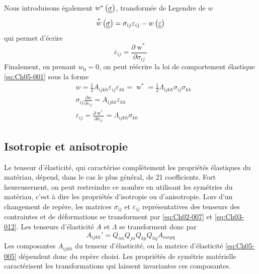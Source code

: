 Nous introduisons également $\mathop{w}^{*}\left( \underline{\underline{\sigma}} \right)$, transformée de Legendre de $w$
\begin{equation}
    \mathop{w}^{*}\left( \underline{\underline{\sigma}} \right) = \sigma_{ij} \varepsilon_{ij} - w \left( \underline{\underline{\varepsilon}} \right)
    \label{eq:Ch05-010}
\end{equation}
qui permet d'écrire
\begin{equation}
    \varepsilon_{ij} = \frac{\partial \mathop{w}^*}{\partial \sigma_{ij}}
    \label{eq:Ch05-011}
\end{equation}
Finalement, en prenant $w_0=0$, on peut réécrire la loi de comportement élastique \eqref{eq:Ch05-001} sous la forme
\begin{equation}
    \begin{aligned}
        & w = \frac{1}{2} A_{ijkh} \varepsilon_{ij} \varepsilon_{kh} = \mathop{w}^* = \frac{1}{2} \Lambda_{ijkh} \sigma_{ij} \sigma_{kh} \\
        & \sigma_{ij} \frac{\partial w}{\partial \varepsilon_{ij}} = A_{ijkh} \varepsilon_{kh} \\
        & \varepsilon_{ij} = \frac{\partial \mathop{w}^*}{\partial \sigma_{ij}} = \Lambda_{ijkh} \sigma_{kh}
    \end{aligned}
    \label{eq:Ch05-012}
\end{equation}

\subsection{Isotropie et anisotropie}
Le tenseur d'élasticité, qui caractérise complètement les propriétés élastiques du matériau, dépend, dans le cas le plus général, de 21 coefficients.
Fort heureusernent, on peut restreindre ce nombre en utilisant les symétries du matériau, c'est à dire les propriétés d'isotropie ou d'anisotropie.
Lors d'un changement de repère, les matrices $\sigma_{ij}$ et $\varepsilon_{ij}$ représentatives des tenseurs des contraintes et de déformations se transforment par \eqref{eq:Ch02-007} et \eqref{eq:Ch03-012}.
Les tenseurs d'élasticité $A$ et $\Lambda$ se transforment donc par
\begin{equation}
    A_{ijkh}' = Q_{im} Q_{jn} Q_{kp} Q_{hq} A_{mnpq}
    \label{eq:Ch05-013}
\end{equation}
Les composantes $A_{ijkh}$ du tenseur d'élasticité, ou la matrice d'élasticité \eqref{eq:Ch05-005} dépendent donc du repère choisi.
Les propriétés de symétrie matérielle caractérisent les transformations qui laissent invariantes ces composantes.


